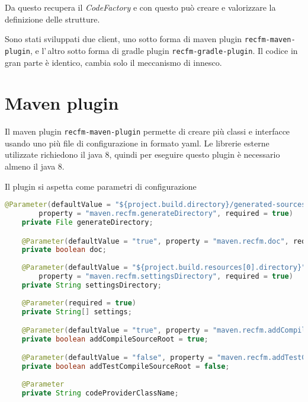 \documentclass[a4paper,10pt]{report}
\begin{document}
Da questo recupera il \textsl{CodeFactory} e con questo può creare e valorizzare
la definizione delle strutture.

Sono stati sviluppati due client, uno sotto forma di maven plugin 
\verb!recfm-maven-plugin!, e l'\,altro sotto forma di gradle plugin 
\verb!recfm-gradle-plugin!. Il codice in gran parte è identico, cambia solo il 
meccanismo di innesco.

\section{Maven plugin}
Il maven plugin \verb!recfm-maven-plugin! permette di creare più classi e 
interfacce usando uno più file di configurazione in formato yaml.
Le librerie esterne utilizzate richiedono il java 8, quindi per eseguire questo 
plugin è necessario almeno il java 8.

Il plugin si aspetta come parametri di configurazione
\begin{lstlisting}[language=java, caption=parametri impostabili del maven plugin, 
label=code:spring-conf]
    @Parameter(defaultValue = "${project.build.directory}/generated-sources/recfm",
        property = "maven.recfm.generateDirectory", required = true)
    private File generateDirectory;

    @Parameter(defaultValue = "true", property = "maven.recfm.doc", required = true)
    private boolean doc;
    
    @Parameter(defaultValue = "${project.build.resources[0].directory}",
        property = "maven.recfm.settingsDirectory", required = true)
    private String settingsDirectory;
    
    @Parameter(required = true)
    private String[] settings;

    @Parameter(defaultValue = "true", property = "maven.recfm.addCompileSourceRoot")
    private boolean addCompileSourceRoot = true;

    @Parameter(defaultValue = "false", property = "maven.recfm.addTestCompileSourceRoot")
    private boolean addTestCompileSourceRoot = false;
    
    @Parameter
    private String codeProviderClassName;
\end{lstlisting}
\end{document}
